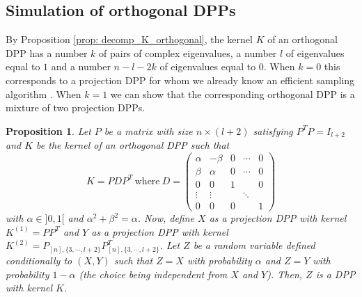 \documentclass{article}
\numberwithin{equation}{section}
\theoremstyle{plain}
\newtheorem{proposition}{Proposition}[section]
\begin{document}
\subsection{Simulation of orthogonal DPPs}\label{subsec: DPP_sim}

By Proposition \ref{prop: decomp_K_orthogonal}, the kernel $K$ of an orthogonal DPP has a number $k$ of pairs of complex eigenvalues, a number $l$ of eigenvalues equal to $1$ and a number $n-l-2k$ of eigenvalues equal to $0$. When $k=0$ this corresponds to a projection DPP for whom we already know an efficient sampling algorithm \cite[Algorithm 4.4.2]{Hough}. When $k=1$ we can show that the corresponding orthogonal DPP is a mixture of two projection DPPs.

\begin{proposition}
Let $P$ be a matrix with size $n \times (l+2)$ satisfying $P^TP=I_{l+2}$ and $K$ be the kernel of an orthogonal DPP such that
\begin{equation}\label{eq: decomp_K_orthogonal_k=1}
K=PDP^T~\mbox{where}~D=\begin{pmatrix}
\alpha & -\beta & 0 & \cdots & 0\\
\beta & \alpha & 0 & \cdots & 0\\
0 & 0 & 1 & & 0 \\
\vdots & \vdots & & \ddots & \\
0 & 0 & 0 & & 1
\end{pmatrix}
\end{equation}
with $\alpha\in ]0, 1[$ and $\alpha^2+\beta^2=\alpha$. Now, define $X$ as a projection DPP with kernel $K^{(1)}=PP^T$ and $Y$ as a projection DPP with kernel $K^{(2)}=P_{[n],\{3,\cdots, l+2\}}P_{[n],\{3,\cdots, l+2\}}^T$. Let $Z$ be a random variable defined conditionally to $(X, Y)$ such that $Z=X$ with probability $\alpha$ and $Z=Y$ with probability $1-\alpha$ (the choice being independent from $X$ and $Y$). Then, $Z$ is a DPP with kernel $K$.
\end{proposition}
\end{document}
